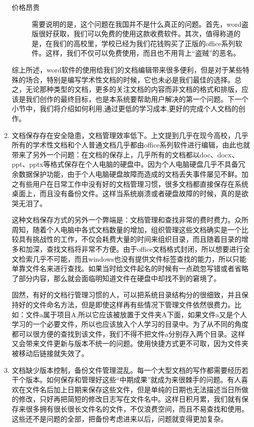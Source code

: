 \begin{enumerate}
\begin{description}
  \item[价格昂贵] 需要说明的是，这个问题在我国并不是什么真正的问题。首先，word盗版很好获取，我们可以免费的使用这款收费软件。其次，值得称道的是，在我们的高校里，学校已经为我们花钱购买了正版的office系列软件。这样，我们不仅可以免费使用，而且也不用背上“盗贼”的恶名。
  \end{description}
综上所述，word软件的使用给我们的文档编辑带来很多便利，但是对于某些特殊的场合，特别是编写学术性文档的时候，它也未必是我们最佳的选择。总之，无论那种类型的文档，更多的关注文档的内容而非文档的格式和排版，应该是我们创作的最终目标，也是本系统要帮助用户解决的第一个问题。下一个小节中，我们将介绍如何利用,通过更低的学习成本,更好的完成个人文档的创作。
\item 文档保存存在安全隐患，文档管理效率低下。上文提到几乎在现今高校，几乎所有的学术性文档和个人普通文档几乎都由office系列软件进行编辑，由此也就带来了另外一个问题：在文档的保存上，几乎所有的文档都以doc、docx、ppt、pptx等格式保存在个人电脑的硬盘中。因为个人电脑硬盘几乎不具备冗余数据保护功能，由于个人电脑硬盘故障而造成的文档丢失事件屡见不鲜。加之有些用户在日常工作中没有好的文档管理习惯，很多文档都直接保存在系统桌面上，而且没有备份文件。这样当系统崩溃或者硬盘故障的时候，真的是欲哭无泪了。

这种文档保存方式的另外一个弊端是：文档管理和查找非常的费时费力。众所周知，随着个人电脑中各式文档数量的增加，组织管理这些文档确实是一个比较具有挑战性的工作，不仅会耗费大量的时间来组织目录，而且随着目录的增多和加深，查找文档将非常不方便。由于office文档格式封闭，所以想要进行全文检索几乎不可能，而且windows也没有提供文件标签查找的能力，所以只能单靠文件名来进行查找。如果当时给文件起名的时候有一点疏忽写错或者省略了部分内容，那么就会面临明知道文件在硬盘中却找不到的窘境了。

固然，有好的文档行管理习惯的人，可以把系统目录结构分的很细致，并且保持好的文件命名方法，但是即使这样再有些情况下管理文件依然很费力。比如：文件a属于项目A,所以它应该被放置于文件夹A下面，如果文件a又是个人学习的一个必要文件，所以也应该放入个人学习的目录中。为了从不同的角度都可以很方便的查找到该文件，我们不得不把文件a分别存入两个目录。这样又会带来文件更新与版本不统一的问题。使用快捷方式更不可取，因为文件夹被移动后链接就失效了。
\item 文档缺少版本控制，备份文件管理混乱。每一个大型文档的写作都需要经历若干个版本。如何保存和管理好这些“中期成果”就成为来很棘手的问题。有人喜欢在文件名后加上日期来保存这些文件，但是单纯的日期也无法描述当日所做的修改，只好再把简短的修改日志写在文件名中。这样日积月累，我们就有保存来很多拥有很长很长文件名的文件，不仅浪费空间，而且不易查找和使用。这些还不是问题的全部，把备份考虑进来以后，问题就变得更加复杂。


\end{enumerate}
